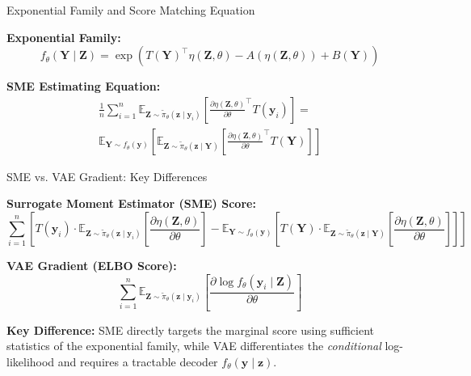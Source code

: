 \documentclass{beamer}
\begin{document}
\begin{frame}{Exponential Family and Score Matching Equation}

\vspace{1em}
\textbf{Exponential Family:}
\begin{equation*}
f_\theta(\mathbf{Y} \mid \mathbf{Z}) = \exp\left( 
T(\mathbf{Y})^\top \eta(\mathbf{Z}, \theta) - A(\eta(\mathbf{Z}, \theta)) + B(\mathbf{Y})
\right)
\end{equation*}

\vspace{1em}
\textbf{SME Estimating Equation:}
\begin{multline*}
\frac{1}{n}\sum_{i=1}^n \mathbb{E}_{\mathbf{Z} \sim \tilde{\pi}_\theta(\mathbf{z} \mid \mathbf{y}_i)} 
\left[
\frac{\partial \eta(\mathbf{Z}, \theta)}{\partial \theta}^\top T(\mathbf{y}_i)
\right] = \\ \mathbb{E}_{\mathbf{Y} \sim f_\theta(\mathbf{y})} \left[
\mathbb{E}_{\mathbf{Z} \sim \tilde{\pi}_\theta(\mathbf{z} \mid \mathbf{Y})}
\left[
\frac{\partial \eta(\mathbf{Z}, \theta)}{\partial \theta}^\top T(\mathbf{Y})
\right]
\right]
\end{multline*}

\end{frame}


\begin{frame}{SME vs. VAE Gradient: Key Differences}

\textbf{Surrogate Moment Estimator (SME) Score:}
\[
\sum_{i=1}^n \left[
T(\mathbf{y}_i)
\cdot
\mathbb{E}_{\mathbf{Z} \sim \tilde{\pi}_\theta(\mathbf{z} \mid \mathbf{y}_i)}
\left[
\frac{\partial \eta(\mathbf{Z}, \theta)}{\partial \theta}
\right]
-
\mathbb{E}_{\mathbf{Y} \sim f_\theta(\mathbf{y})}
\left[
T(\mathbf{Y})
\cdot
\mathbb{E}_{\mathbf{Z} \sim \tilde{\pi}_\theta(\mathbf{z} \mid \mathbf{Y})}
\left[
\frac{\partial \eta(\mathbf{Z}, \theta)}{\partial \theta}
\right]
\right]
\right]
\]

\vspace{1em}

\textbf{VAE Gradient (ELBO Score):}
\[
\sum_{i=1}^n
\mathbb{E}_{\mathbf{Z} \sim \tilde{\pi}_\theta(\mathbf{z} \mid \mathbf{y}_i)}
\left[
\frac{\partial \log f_\theta(\mathbf{y}_i \mid \mathbf{Z})}{\partial \theta}
\right]
\]

\vspace{1em}

\textbf{Key Difference:} SME directly targets the marginal score using sufficient statistics of the exponential family, while VAE differentiates the \textit{conditional} log-likelihood and requires a tractable decoder \( f_\theta(\mathbf{y} \mid \mathbf{z}) \).

\end{frame}
\end{document}
